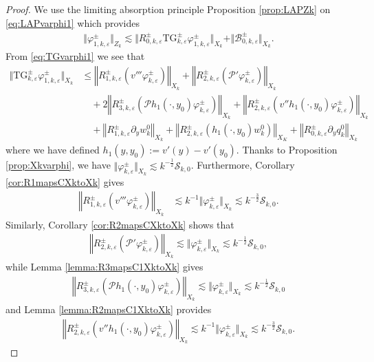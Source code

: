 \documentclass[11pt,reqno]{amsproc}
\theoremstyle{definition}
\numberwithin{equation}{section}
\newcommand{\B}{{\mathcal{B}}}
\newcommand{\cS}{{\mathcal S}}
\newcommand{\ep}{\varepsilon}
\renewcommand{\P}{{\mathcal{P}}}
\begin{document}
\begin{proof}
We use the limiting absorption principle Proposition \ref{prop:LAPZk} on \eqref{eq:LAPvarphi1} which provides
\begin{align*}
\Vert \varphi_{1,k,\ep}^\pm \Vert_{Z_k}\lesssim \Vert R_{0,k,\ep}^\pm\text{TG}_{k,\ep}^\pm\varphi_{1,k,\ep}^\pm \Vert_{X_k} + \Vert \B_{0,k,\ep}^\pm \Vert_{X_k}.
\end{align*}
From \eqref{eq:TGvarphi1} we see that
\begin{align*}
\Vert \text{TG}_{k,\ep}^\pm\varphi_{1,k,\ep}^\pm \Vert_{X_k}  &\leq \left\Vert R_{1,k,\ep}^\pm\left( v'''\varphi_{k,\ep}^\pm \right) \right\Vert_{X_k} + \left\Vert R_{2,k,\ep}^\pm \left(\P'\varphi_{k,\ep}^\pm\right) \right\Vert_{X_k} \\
&\quad + 2 \left\Vert R_{3,k,\ep}^\pm \left( \P h_1(\cdot,y_0) \varphi_{k,\ep}^\pm  \right)  \right\Vert_{X_k}  + \left\Vert R_{2,k,\ep}^\pm \left(v'' h_1(\cdot,y_0)\varphi_{k,\ep}^\pm \right)  \right\Vert_{X_k} \\
&\quad + \left\Vert R_{1,k,\ep}^\pm \partial_y w_k^0 \right\Vert_{X_k} + \left\Vert R_{2,k,\ep}^\pm \left(h_1(\cdot,y_0) w_k^0\right) \right \Vert_{X_K} + \left\Vert R_{0,k,\ep}^\pm \partial_y q_k^0 \right\Vert_{X_k}
\end{align*}
where we have defined $h_1(y,y_0):=v'(y) - v'(y_0)$. Thanks to Proposition \ref{prop:Xkvarphi}, we have $\Vert \varphi_{k,\ep}^\pm \Vert_{X_k}\lesssim k^{-\frac12}\cS_{k,0}$. Furthermore,  Corollary \ref{cor:R1mapsCXktoXk} gives
\begin{align*}
\left\Vert R_{1,k,\ep}^\pm\left( v'''\varphi_{k,\ep}^\pm \right) \right\Vert_{X_k} &\lesssim k^{-1}\Vert \varphi_{k,\ep}^\pm \Vert_{X_k} \lesssim k^{-\frac32}\cS_{k,0}.
\end{align*}
Similarly, Corollary \ref{cor:R2mapsCXktoXk} shows that
\begin{align*}
\left\Vert R_{2,k,\ep}^\pm \left(\P'\varphi_{k,\ep}^\pm\right) \right\Vert_{X_k} \lesssim \Vert \varphi_{k,\ep}^\pm \Vert_{X_k}\lesssim k^{-\frac12}\cS_{k,0},
\end{align*}
while Lemma \ref{lemma:R3mapsC1XktoXk} gives
\begin{align*}
\left\Vert R_{3,k,\ep}^\pm \left( \P h_1(\cdot,y_0) \varphi_{k,\ep}^\pm  \right)  \right\Vert_{X_k} \lesssim \Vert \varphi_{k,\ep}^\pm \Vert_{X_k}\lesssim k^{-\frac12}\cS_{k,0}
\end{align*}
and Lemma \ref{lemma:R2mapsC1XktoXk} provides
\begin{align*}
\left\Vert R_{2,k,\ep}^\pm \left(v'' h_1(\cdot,y_0)\varphi_{k,\ep}^\pm \right)  \right\Vert_{X_k}\lesssim k^{-1}\Vert \varphi_{k,\ep}^\pm \Vert_{X_k}\lesssim k^{-\frac32}\cS_{k,0}.

\end{align*}
\end{proof}
\end{document}
